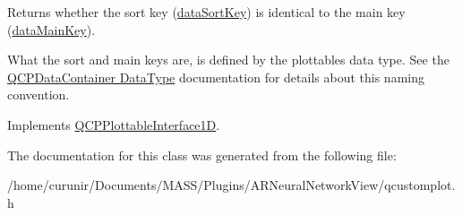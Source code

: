 Returns whether the sort key (\hyperlink{class_q_c_p_abstract_plottable1_d_acee921e5fcbdd82d1864d361a12f8971}{data\+Sort\+Key}) is identical to the main key (\hyperlink{class_q_c_p_abstract_plottable1_d_adc6821839b138f8e8696bdb18dd6ad45}{data\+Main\+Key}).

What the sort and main keys are, is defined by the plottable\textquotesingle{}s data type. See the \hyperlink{class_q_c_p_data_container_qcpdatacontainer-datatype}{Q\+C\+P\+Data\+Container Data\+Type} documentation for details about this naming convention. 

Implements \hyperlink{class_q_c_p_plottable_interface1_d_a229e65e7ab968dd6cd0e259fa504b79d}{Q\+C\+P\+Plottable\+Interface1D}.



The documentation for this class was generated from the following file\+:\begin{DoxyCompactItemize}
\item 
/home/curunir/\+Documents/\+M\+A\+S\+S/\+Plugins/\+A\+R\+Neural\+Network\+View/qcustomplot.\+h\end{DoxyCompactItemize}
